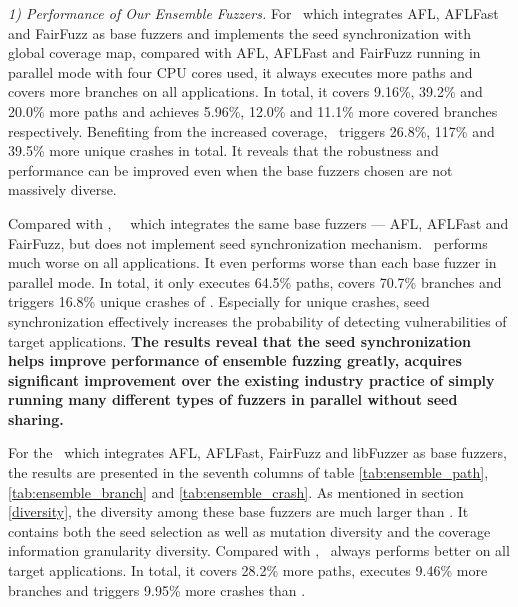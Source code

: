 \textit{1) Performance of Our Ensemble Fuzzers.}
For \toolOne ~which integrates AFL, AFLFast and FairFuzz as base fuzzers and implements the seed synchronization with global coverage map, compared with AFL, AFLFast and FairFuzz running in parallel mode with four CPU cores used, it always executes more paths and covers more branches on all applications. In total, it covers 9.16\%, 39.2\% and 20.0\% more paths and achieves 5.96\%, 12.0\% and 11.1\% more covered branches respectively.
Benefiting from the increased coverage, \toolOne ~triggers 26.8\%, 117\% and 39.5\% more unique crashes in total.
It reveals that the robustness and performance can be improved even when the base fuzzers chosen are not massively diverse.

Compared with \toolOne, ~\toolFour ~which integrates the same base fuzzers --- AFL, AFLFast and FairFuzz, but does not implement seed synchronization mechanism. 
\toolFour ~performs much worse on all applications. It even performs worse than each base fuzzer in parallel mode. In total, it only executes 64.5\% paths, covers 70.7\% branches and triggers 16.8\% unique crashes of \toolOne. Especially for unique crashes, seed synchronization effectively increases the probability of detecting vulnerabilities of target applications. \textbf{The results reveal that the seed synchronization helps improve performance of ensemble fuzzing greatly, acquires significant improvement over the existing industry practice of simply running many different types of fuzzers in parallel without seed sharing. }

For the \toolTwo ~which integrates AFL, AFLFast, FairFuzz and libFuzzer as base fuzzers, the results are presented in the seventh columns of table \ref{tab:ensemble_path},  \ref{tab:ensemble_branch} and  \ref{tab:ensemble_crash}.
As mentioned in section \ref{diversity}, the diversity among these base fuzzers are much larger than \toolOne. It contains both the seed selection as well as mutation diversity and the coverage information granularity diversity. 
Compared with \toolOne, \toolTwo ~always performs better on all target applications. In total, it covers 28.2\% more paths, executes 9.46\% more branches and triggers 9.95\% more crashes than \toolOne.




